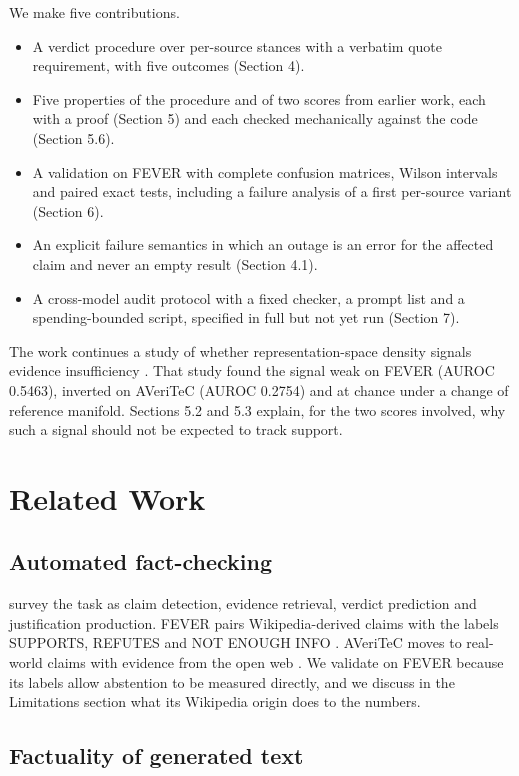 \documentclass[11pt,a4paper]{article}
\begin{document}
We make five contributions.

\begin{itemize}
\item A verdict procedure over per-source stances with a verbatim quote requirement, with five outcomes (Section 4).
\item Five properties of the procedure and of two scores from earlier work, each with a proof (Section 5) and each checked mechanically against the code (Section 5.6).
\item A validation on FEVER with complete confusion matrices, Wilson intervals and paired exact tests, including a failure analysis of a first per-source variant (Section 6).
\item An explicit failure semantics in which an outage is an error for the affected claim and never an empty result (Section 4.1).
\item A cross-model audit protocol with a fixed checker, a prompt list and a spending-bounded script, specified in full but not yet run (Section 7).
\end{itemize}

The work continues a study of whether representation-space density signals evidence insufficiency \citep{ss2026}. That study found the signal weak on FEVER (AUROC 0.5463), inverted on AVeriTeC (AUROC 0.2754) and at chance under a change of reference manifold. Sections 5.2 and 5.3 explain, for the two scores involved, why such a signal should not be expected to track support.

\section{Related Work}

\subsection{Automated fact-checking}

\citet{guo2022} survey the task as claim detection, evidence retrieval, verdict prediction and justification production. FEVER pairs Wikipedia-derived claims with the labels SUPPORTS, REFUTES and NOT ENOUGH INFO \citep{thorne2018}. AVeriTeC moves to real-world claims with evidence from the open web \citep{schlichtkrull2023}. We validate on FEVER because its labels allow abstention to be measured directly, and we discuss in the Limitations section what its Wikipedia origin does to the numbers.

\subsection{Factuality of generated text}
\end{document}
